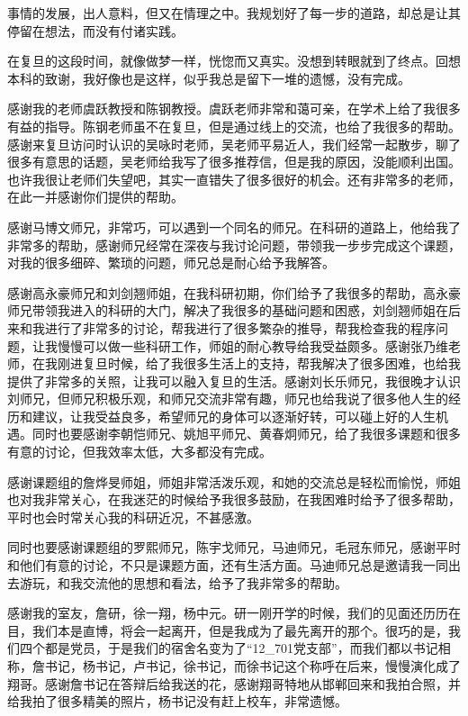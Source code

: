 \documentclass[type=master]{fduthesis}
\begin{document}
\begin{acknowledgements}
  事情的发展，出人意料，但又在情理之中。我规划好了每一步的道路，却总是让其停留在想法，而没有付诸实践。

  在复旦的这段时间，就像做梦一样，恍惚而又真实。没想到转眼就到了终点。回想本科的致谢，我好像也是这样，似乎我总是留下一堆的遗憾，没有完成。

  感谢我的老师虞跃教授和陈钢教授。虞跃老师非常和蔼可亲，在学术上给了我很多有益的指导。陈钢老师虽不在复旦，但是通过线上的交流，也给了我很多的帮助。感谢来复旦访问时认识的吴咏时老师，吴老师平易近人，我们经常一起散步，聊了很多有意思的话题，吴老师给我写了很多推荐信，但是我的原因，没能顺利出国。也许我很让老师们失望吧，其实一直错失了很多很好的机会。还有非常多的老师，在此一并感谢你们提供的帮助。

  感谢马博文师兄，非常巧，可以遇到一个同名的师兄。在科研的道路上，他给我了非常多的帮助，感谢师兄经常在深夜与我讨论问题，带领我一步步完成这个课题，对我的很多细碎、繁琐的问题，师兄总是耐心给予我解答。

  感谢高永豪师兄和刘剑翘师姐，在我科研初期，你们给予了我很多的帮助，高永豪师兄带领我进入的科研的大门，解决了我很多的基础问题和困惑，刘剑翘师姐在后来和我进行了非常多的讨论，帮我进行了很多繁杂的推导，帮我检查我的程序问题，让我慢慢可以做一些科研工作，师姐的耐心教导给我受益颇多。感谢张乃维老师，在我刚进复旦时候，给了我很多生活上的支持，帮我解决了很多困难，也给我提供了非常多的关照，让我可以融入复旦的生活。感谢刘长乐师兄，我很晚才认识刘师兄，但师兄积极乐观，和师兄交流非常有趣，师兄也给我说了很多他人生的经历和建议，让我受益良多，希望师兄的身体可以逐渐好转，可以碰上好的人生机遇。同时也要感谢李朝恺师兄、姚旭平师兄、黄春炯师兄，给了我很多课题和很多有意的讨论，但我效率太低，大多都没有完成。

  感谢课题组的詹烨旻师姐，师姐非常活泼乐观，和她的交流总是轻松而愉悦，师姐也对我非常关心，在我迷茫的时候给予我很多鼓励，在我困难时给予了很多帮助，平时也会时常关心我的科研近况，不甚感激。

  同时也要感谢课题组的罗熙师兄，陈宇戈师兄，马迪师兄，毛冠东师兄，感谢平时和他们有意的讨论，不只是课题方面，还有生活方面。马迪师兄总是邀请我一同出去游玩，和我交流他的思想和看法，给予了我非常多的帮助。

  感谢我的室友，詹研，徐一翔，杨中元。研一刚开学的时候，我们的见面还历历在目，我们本是直博，将会一起离开，但是我成为了最先离开的那个。很巧的是，我们四个都是党员，于是我们的宿舍名变为了“12\_701党支部”，而我们都以书记相称，詹书记，杨书记，卢书记，徐书记，而徐书记这个称呼在后来，慢慢演化成了翔哥。感谢詹书记在答辩后给我送的花，感谢翔哥特地从邯郸回来和我拍合照，并给我拍了很多精美的照片，杨书记没有赶上校车，非常遗憾。


\end{acknowledgements}
\end{document}
